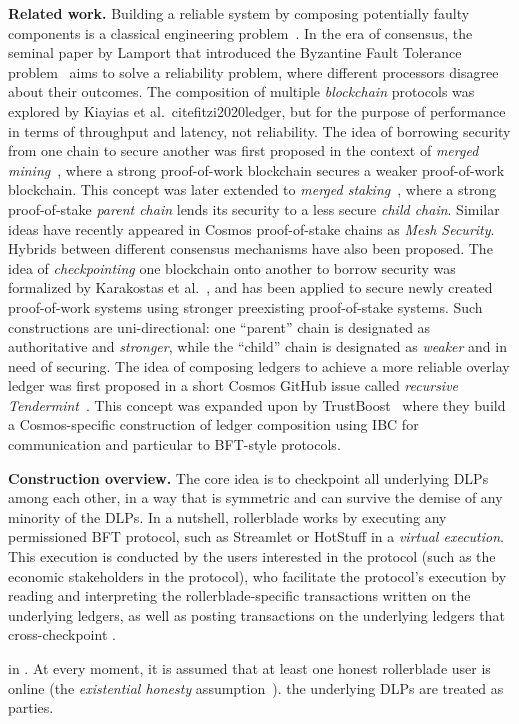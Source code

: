 \noindent
\textbf{Related work.} Building a reliable system by composing potentially faulty components
is a classical engineering problem~\cite{von1956probabilistic,moore1956reliable}.
In the era of consensus, the seminal
paper by Lamport that introduced the Byzantine Fault Tolerance problem~\cite{shostak1982byzantine}
aims to solve a reliability problem, where different processors disagree about their
outcomes. The composition of multiple \emph{blockchain} protocols was explored by
Kiayias et al.~cite{fitzi2020ledger}, but for the purpose of performance in terms of throughput
and latency, not reliability. The idea of borrowing security from one chain to
secure another was first proposed in the context of \emph{merged mining}~\cite{namecoin}, where
a strong proof-of-work blockchain secures a weaker proof-of-work blockchain. This
concept was later extended to \emph{merged staking}~\cite{pos-sidechains}, where a
strong proof-of-stake \emph{parent chain} lends its security to a less secure
\emph{child chain}. Similar ideas have recently appeared in Cosmos proof-of-stake
chains as \emph{Mesh Security}. Hybrids between different consensus mechanisms
have also been proposed. The idea of \emph{checkpointing}
one blockchain onto another to borrow security was formalized by Karakostas et al.~\cite{karakostas2021securing},
and has been applied to secure newly created proof-of-work systems using stronger
preexisting proof-of-stake systems. Such constructions are uni-directional:
one ``parent'' chain is designated as authoritative and \emph{stronger},
while the ``child'' chain is designated as \emph{weaker} and in need of securing.
The idea of composing ledgers to achieve a more reliable overlay ledger
was first proposed in a short Cosmos GitHub issue called
\emph{recursive Tendermint}~\cite{recursive-tendermint}.
This concept was expanded upon by TrustBoost~\cite{trustboost}
where they build a Cosmos-specific construction of ledger composition
using IBC for communication and particular to BFT-style protocols.

\noindent
\textbf{Construction overview.}
The core idea is to checkpoint all underlying DLPs among each other, in
a way that is symmetric and can survive the demise of any minority of the
DLPs.
In a nutshell, rollerblade works by executing any permissioned BFT protocol,
such as Streamlet or HotStuff in a \emph{virtual execution}. This execution is
conducted by the users interested in the protocol (such as the economic stakeholders
in the protocol), who facilitate the protocol's execution by reading and interpreting
the rollerblade-specific transactions written on the underlying ledgers, as well as
posting transactions on the underlying ledgers that cross-checkpoint .

in . At every moment, it is
assumed that at least one honest rollerblade user is online (the
\emph{existential honesty} assumption~\cite{backbone}).
the underlying DLPs are treated as parties.
